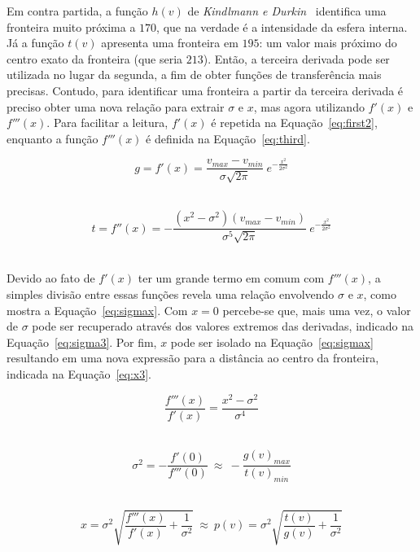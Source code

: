 	Em contra partida, a função $ h(v) $ de \textit{Kindlmann e Durkin}~\cite{gordon} identifica uma fronteira muito próxima a $ 170 $, que na verdade é a intensidade da esfera interna. Já a função $ t(v) $ apresenta uma fronteira em $ 195 $: um valor mais próximo do centro exato da fronteira (que seria $ 213 $). Então, a terceira derivada pode ser utilizada no lugar da segunda, a fim de obter funções de transferência mais precisas. Contudo, para identificar uma fronteira a partir da terceira derivada é preciso obter uma nova relação para extrair $ \sigma $ e $ x $, mas agora utilizando $ f'(x) $ e $ f'''(x) $. Para facilitar a leitura, $ f'(x) $ é repetida na Equação~\eqref{eq:first2}, enquanto a função $ f'''(x) $ é definida na Equação~\eqref{eq:third}.
	
\begin{equation} \label{eq:first2}
g = f'(x) = \frac{v_{max} - v_{min}}{\sigma\sqrt{2\pi}}\ e^{-\frac{x^{2}}{2\sigma^{2}}}
\end{equation} \

\begin{equation} \label{eq:third}
t = f''(x) = -\frac{(x^{2} - \sigma^{2})(v_{max} - v_{min})}{\sigma^{5}\sqrt{2\pi}}\ e^{-\frac{x^{2}}{2\sigma^{2}}}
\end{equation} \
	
	Devido ao fato de $ f'(x) $ ter um grande termo em comum com $ f'''(x) $, a simples divisão entre essas funções revela uma relação envolvendo $ \sigma $ e $ x $, como mostra a Equação~\eqref{eq:sigmax}. Com $ x = 0 $ percebe-se que, mais uma vez, o valor de $ \sigma $ pode ser recuperado através dos valores extremos das derivadas, indicado na Equação~\eqref{eq:sigma3}. Por fim, $ x $ pode ser isolado na Equação~\eqref{eq:sigmax} resultando em uma nova expressão para a distância ao centro da fronteira, indicada na Equação~\eqref{eq:x3}.

\begin{equation} \label{eq:sigmax}
	\frac{f'''(x)}{f'(x)} = \frac{x^{2} - \sigma^{2}}{\sigma^{4}}
\end{equation} \

\begin{equation} \label{eq:sigma3}
	\sigma^{2} = -\frac{f'(0)}{f'''(0)} \ \approx \ -\frac{g(v)_{max}}{t(v)_{min}}
\end{equation} \

\begin{equation} \label{eq:x3}
	x = \sigma^{2}\sqrt{\frac{f'''(x)}{f'(x)} + \frac{1}{\sigma^{2}}} \ \approx \ 
	p(v) = \sigma^{2}\sqrt{\frac{t(v)}{g(v)} + \frac{1}{\sigma^{2}}}
\end{equation} \

